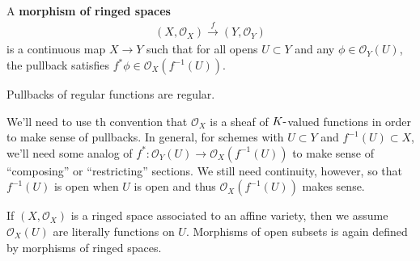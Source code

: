 \begin{definition}

A \textbf{morphism of ringed spaces}
\begin{align*}  
(X, {\mathcal{O}}_X) \xrightarrow{f}  (Y, {\mathcal{O}}_Y)
\end{align*}
is a continuous map \(X\to Y\) such that for all opens \(U \subset Y\)
and any \(\phi \in {\mathcal{O}}_Y(U)\), the pullback satisfies
\(f^* \phi \in {\mathcal{O}}_X(f^{-1}(U))\).

\end{definition}

\begin{slogan}

Pullbacks of regular functions are regular.

\end{slogan}

\begin{remark}

We'll need to use th convention that \({\mathcal{O}}_X\) is a sheaf of
\(K{\hbox{-}}\)valued functions in order to make sense of pullbacks. In
general, for schemes with \(U \subset Y\) and \(f^{-1} (U) \subset X\),
we'll need some analog of
\(f^*: {\mathcal{O}}_Y(U) \to {\mathcal{O}}_X(f^{-1} (U) )\) to make
sense of ``composing'' or ``restricting'' sections. We still need
continuity, however, so that \(f^{-1}(U)\) is open when \(U\) is open
and thus \({\mathcal{O}}_X(f^{-1}(U))\) makes sense.

\end{remark}

\begin{example}

If \((X, {\mathcal{O}}_X)\) is a ringed space associated to an affine
variety, then we assume \({\mathcal{O}}_X(U)\) are literally functions
on \(U\). Morphisms of open subsets is again defined by morphisms of
ringed spaces.

\end{example}

